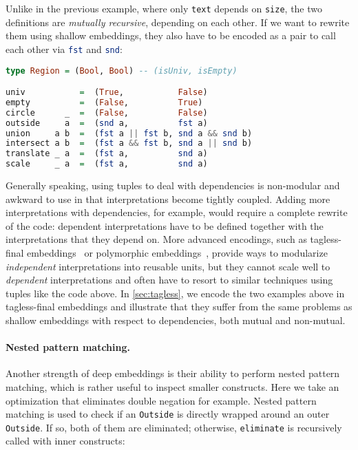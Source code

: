\noindent
Unlike in the previous example, where only \lstinline{text} depends on
\lstinline{size}, the two definitions are \emph{mutually recursive}, depending
on each other. If we want to rewrite them using shallow embeddings, they also
have to be encoded as a pair to call each other via
\lstinline[language=Haskell]{fst} and \lstinline[language=Haskell]{snd}:

\begin{lstlisting}[language=Haskell,deletekeywords={union,intersect}]
type Region = (Bool, Bool) -- (isUniv, isEmpty)

univ           =  (True,           False)
empty          =  (False,          True)
circle      _  =  (False,          False)
outside     a  =  (snd a,          fst a)
union     a b  =  (fst a || fst b, snd a && snd b)
intersect a b  =  (fst a && fst b, snd a || snd b)
translate _ a  =  (fst a,          snd a)
scale     _ a  =  (fst a,          snd a)
\end{lstlisting}

\noindent 
Generally speaking, using tuples to deal with dependencies is non-modular and
awkward to use in that interpretations become tightly coupled. Adding more
interpretations with dependencies, for example, would require a complete rewrite
of the code: dependent interpretations have to be defined together with the
interpretations that they depend on. More advanced encodings, such as
tagless-final embeddings~\citep{kiselyov2010typed} or polymorphic
embeddings~\citep{hofer2008polymorphic}, provide ways to modularize
\emph{independent} interpretations into reusable units, but they cannot scale
well to \emph{dependent} interpretations and often have to resort to similar
techniques using tuples like the code above. In \autoref{sec:tagless}, we encode
the two examples above in tagless-final embeddings and illustrate that they
suffer from the same problems as shallow embeddings with respect to
dependencies, both mutual and non-mutual.

\paragraph{Nested pattern matching.} \label{sec:nested}
Another strength of deep embeddings is their ability to perform nested pattern
matching, which is rather useful to inspect smaller constructs. Here we take
an optimization that eliminates double negation for example. Nested pattern
matching is used to check if an \lstinline{Outside} is directly wrapped around
an outer \lstinline{Outside}. If so, both of them are eliminated; otherwise,
\lstinline{eliminate} is recursively called with inner constructs:

